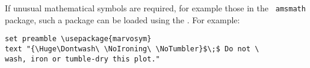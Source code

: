 If unusual mathematical symbols are required, for example those in the {\tt
amsmath} package, such a package
can be loaded using the . For example:

\begin{verbatim}
set preamble \usepackage{marvosym}
text "{\Huge\Dontwash\ \NoIroning\ \NoTumbler}$\;$ Do not \
wash, iron or tumble-dry this plot."
\end{verbatim}

\begin{center}
\end{center}

